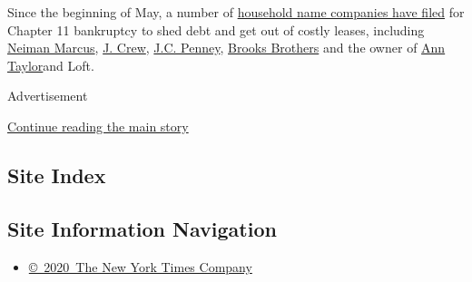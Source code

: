 Since the beginning of May, a number of
\href{https://www.nytimes3xbfgragh.onion/2020/07/23/business/ascena-bankruptcy-ann-taylor-lane-bryant.html}{household
name companies have filed} for Chapter 11 bankruptcy to shed debt and
get out of costly leases, including
\href{https://www.nytimes3xbfgragh.onion/2020/05/07/business/neiman-marcus-bankruptcy.html}{Neiman
Marcus},
\href{https://www.nytimes3xbfgragh.onion/2020/05/03/business/j-crew-bankruptcy-coronavirus.html}{J.
Crew},
\href{https://www.nytimes3xbfgragh.onion/2020/05/15/business/jc-penney-bankruptcy-coronavirus.html}{J.C.
Penney},
\href{https://www.nytimes3xbfgragh.onion/2020/07/08/business/brooks-brothers-chapter-11-bankruptcy.html}{Brooks
Brothers} and the owner of
\href{https://www.nytimes3xbfgragh.onion/2020/07/23/business/ascena-bankruptcy-ann-taylor-lane-bryant.html}{Ann
Taylor}and Loft.

Advertisement

\protect\hyperlink{after-bottom}{Continue reading the main story}

\hypertarget{site-index}{%
\subsection{Site Index}\label{site-index}}

\hypertarget{site-information-navigation}{%
\subsection{Site Information
Navigation}\label{site-information-navigation}}

\begin{itemize}
\tightlist
\item
  \href{https://help.nytimes3xbfgragh.onion/hc/en-us/articles/115014792127-Copyright-notice}{©~2020~The
  New York Times Company}
\end{itemize}

